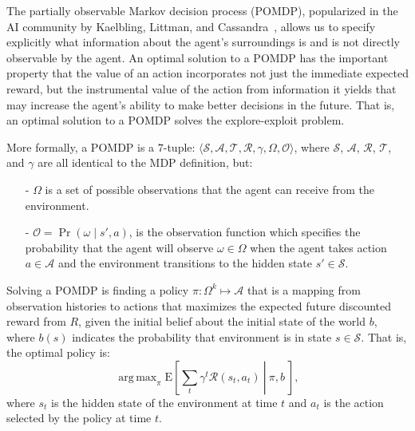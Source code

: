 \documentclass[11pt]{article}
\DeclareMathOperator*{\argmax}{arg\,max}
\begin{document}
The partially observable Markov decision process (POMDP), popularized in the AI community by Kaelbling, Littman, and Cassandra~, allows us to specify explicitly what information about the agent's surroundings 
is and is not directly observable by the agent. An optimal solution to a POMDP has the important property that the value of an action incorporates not just the immediate expected reward, but the instrumental value of the action from information it yields that may increase the agent's ability to make better decisions in the future. That is, an optimal solution to a POMDP solves the explore-exploit problem.  

More formally, a POMDP is a $7$-tuple: $\langle \mathcal{S},\mathcal{A},\mathcal{T},\mathcal{R}, \gamma, \Omega,\mathcal{O} \rangle$, where $\mathcal{S}$, $\mathcal{A}$, $\mathcal{R}$, $\mathcal{T}$, and $\gamma$ are all identical to the MDP definition, but:
\begin{itemize}
\item[-] $\Omega$ is a set of possible observations that the agent can receive from the environment.
\item[-] $\mathcal{O} = \Pr(\omega \mid s', a)$, is the observation function which specifies the probability that the agent will observe $\omega \in \Omega$ when the agent takes action $a \in \mathcal{A}$ and the environment transitions to the hidden state $s' \in \mathcal{S}$.
\end{itemize}

Solving a POMDP is finding a policy $\pi : \Omega^k \mapsto \mathcal{A}$ that is a mapping from observation histories to actions that maximizes the expected future discounted reward from $R$, given the initial belief about the initial state of the world $b$, where $b(s)$ indicates the probability that environment is in state $s \in \mathcal{S}$. That is, the optimal policy is:
\begin{equation}
\argmax_\pi \left.\text{E}\left[\sum_t \gamma^t \mathcal{R}(s_t,a_t)\ \right|\ \pi, b\ \right],
\end{equation}
where $s_t$ is the hidden state of the environment at time $t$ and $a_t$ is the action selected by the policy at time $t$. 
\end{document}
